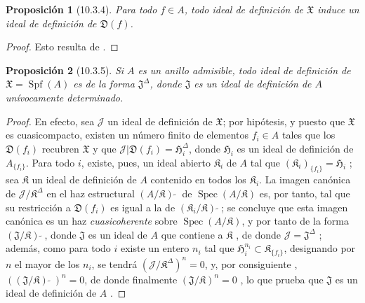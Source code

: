 \documentclass[oneside]{amsart}
\theoremstyle{ega-env-style}
\theoremstyle{ega-thm-env-style}
\newtheorem*{proposition}{Proposición}
\theoremstyle{ega-defn-env-style}
\def\supertilde{{\,\widetilde{\,}\,}}   %
\let\EGAOriginalLabel\label
\renewcommand{\label}[1]{\phantomsection\EGAOriginalLabel{#1}}
\begin{document}
\begin{proposition}[10.3.4]
\label{I.10.3.4}
Para todo $f\in A$, todo ideal de definición de $\mathfrak{X}$ induce un ideal de definición de $\mathfrak{D}(f)$.
\end{proposition}

\begin{proof}
Esto resulta de .
\end{proof}

\begin{proposition}[10.3.5]
\label{I.10.3.5}
Si $A$ es un anillo admisible, todo ideal de definición de $\mathfrak{X}=\operatorname{Spf}(A)$ es de la forma $\mathfrak{J}^\Delta$, donde $\mathfrak{J}$ es un ideal de definición de $A$ unívocamente determinado.
\end{proposition}

\begin{proof}
En efecto, sea $\mathscr{J}$ un ideal de definición de $\mathfrak{X}$; por hipótesis, y puesto que $\mathfrak{X}$ es cuasicompacto, existen un número finito de elementos $f_i\in A$ tales que los $\mathfrak{D}(f_i)$ recubren $\mathfrak{X}$ y que $\mathscr{J}|\mathfrak{D}(f_i)=\mathfrak{H}_i^\Delta$, donde $\mathfrak{H}_i$ es un ideal de definición de $A_{\{f_i\}}$.
Para todo $i$, existe, pues, un ideal abierto $\mathfrak{K}_i$ de $A$ tal que $(\mathfrak{K}_i)_{\{f_i\}}=\mathfrak{H}_i$ ; sea $\mathfrak{K}$ un ideal de definición de $A$ contenido en todos los $\mathfrak{K}_i$.
La imagen canónica de $\mathscr{J}/\mathfrak{K}^\Delta$ en el haz estructural $(A/\mathfrak{K})\supertilde$ de $\operatorname{Spec}(A/\mathfrak{K})$  es, por tanto, tal que su restricción a $\mathfrak{D}(f_i)$ es igual a la de $(\mathfrak{K}_i/\mathfrak{K})\supertilde$;
se concluye que esta imagen canónica es un haz \emph{cuasicoherente} sobre $\operatorname{Spec}(A/\mathfrak{K})$, y por tanto de la forma $(\mathfrak{J}/\mathfrak{K})\supertilde$, donde $\mathfrak{J}$ es un ideal de $A$ que contiene a $\mathfrak{K}$ , de donde $\mathscr{J}=\mathfrak{J}^\Delta$ ;
además, como para todo $i$ existe un entero $n_i$ tal que $\mathfrak{H}_i^{n_i}\subset\mathfrak{K}_{\{f_i\}}$, designando por $n$ el mayor de los $n_i$, se tendrá $(\mathscr{J}/\mathfrak{K}^\Delta)^n=0$, y, por consiguiente , $((\mathfrak{J}/\mathfrak{K})\supertilde)^n=0$, de donde finalmente $(\mathfrak{J}/\mathfrak{K})^n=0$ , lo que prueba que $\mathfrak{J}$ es un ideal de definición de $A$ .
\end{proof}
\end{document}

